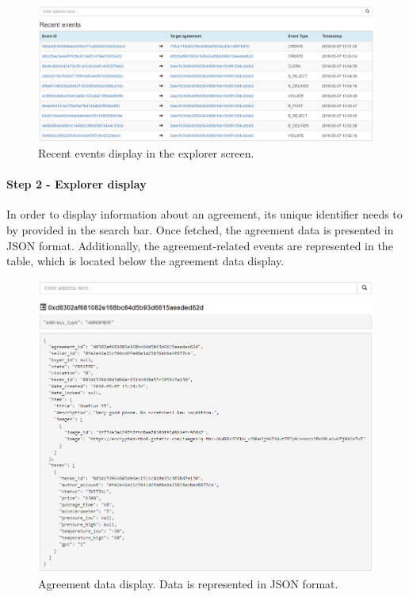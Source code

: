 \begin{figure}[H]
\centering
\includegraphics[scale=0.42]{app_screens/explorer_events.png}
\caption{Recent events display in the explorer screen.}
\label{fig:explorerdash}
\end{figure}

\paragraph{Step 2 - Explorer display}
In order to display information about an agreement, its unique identifier needs to by provided in the search bar. Once fetched, the agreement data is presented in JSON format. Additionally, the agreement-related events are represented in the table, which is located below the agreement data display.

\begin{figure}[H]
\centering
\includegraphics[scale=0.51]{app_screens/explorer_agreement.png}
\caption{Agreement data display. Data is represented in JSON format.}
\label{fig:exploreragreement}
\end{figure}

